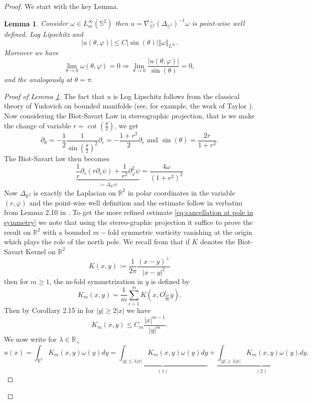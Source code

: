 \documentclass[10pt]{article}
\numberwithin{equation}{section}
\theoremstyle{plain}
\newtheorem{lemma}{Lemma}[section]
\theoremstyle{definition}
\newcommand{\prt}[1]{\left( #1 \right)}
\newcommand{\norm}[1]{\left\Vert #1 \right\Vert}
\newcommand{\abs}[1]{\left| #1 \right|}
\numberwithin{equation}{section}
\begin{document}
\begin{proof}
We start with the key Lemma. 
\begin{lemma}\label{lem:boundness of BS}
Consider $\omega\in L^\infty_m(\mathbb{S}^2)$ then $u=\nabla^\perp_{\mathbb{S}^2}\prt{\Delta_{\mathbb{S}^2}}^{-1}\omega$ is point-wise well defined, Log Lipschitz and 
\[
\abs{u(\theta,\varphi)}\leq C \abs{\sin(\theta)} \norm{\omega}_{L^\infty}.
\]
Moreover we have 
\begin{equation}\label{eq:cancellation at pole in symmetry}
\lim_{\theta\rightarrow 0}\omega(\theta,\varphi)=0\Longrightarrow \lim_{\theta\rightarrow 0} \frac{\abs{u(\theta,\varphi)}}{\sin(\theta)}=0,
\end{equation}
and the analogously at $\theta=\pi$.
\end{lemma}
\begin{proof}[Proof of Lemma \ref{lem:boundness of BS}]
The fact that $u$ is Log Lipschitz follows from the classical theory of Yudovich on bounded manifolds (see, for example, the work of Taylor \cite{Taylor}). Now considering the Biot-Savart Law in stereographic projection, that is we make the change of variable $r=\cot\prt{\frac{\theta}{2}}$, we get 
\[
\partial_\theta =-\frac{1}{2}\frac{1}{\sin\prt{\frac{\theta}{2}}^2}\partial_r=-\frac{1+r^2}{2}\partial_r \text{ and } \sin(\theta)=\frac{2r}{1+r^2}.
\]
The Biot-Savart law then becomes 
\[\underbrace{\frac{1}{r}\partial_r\prt{r\partial_r \psi}+\frac{1}{r^2}\partial_\varphi^2 \psi}_{:=\Delta_{\mathbb{R}^2}\psi}=\frac{4\omega}{(1+r^2)^2}\]
Now $\Delta_{\mathbb{R}^2}$ is exactly the Laplacian on $\mathbb{R}^2$ in polar coordinates in the variable $(r,\varphi)$ and the point-wise well definition and the estimate follow in verbatim from Lemma 2.10 in \cite{EJ-symmetries}. To get the more refined estimate \eqref{eq:cancellation at pole in symmetry} we note that using the stereo-graphic projection it suffice to prove the result on $\mathbb{R}^2$ with a bounded $m-$fold symmetric vorticity vanishing at the origin which plays the role of the north pole.  We recall from \cite{EJ-symmetries} that if $K$ denotes the Biot-Savart Kernel on $\mathbb{R}^2$
\[
K(x,y):=\frac{1}{2\pi}\frac{(x-y)^\perp}{\abs{x-y}^2}
\]
then for $m\geq 1$, the m-fold symmetrization in $y$ is defined by
\[
K_m(x,y)=\frac{1}{m}\sum^m_{i=1}K(x,O^i_{\frac{2\pi}{m}}y).
\]
Then by Corollary 2.15 in \cite{EJ-symmetries} for $\abs{y}\geq 2\abs{x}$ we have 
\[
K_m(x,y)\leq C_m \frac{\abs{x}^{m-1}}{\abs{y}^m}.
\]
We now write for $\lambda \in \mathbb{R}_+$
\[
u(x)=\int_{\mathbb{R}^2}K_m(x,y)\omega(y)dy=\underbrace{\int_{\abs{y}\leq \lambda \abs{x}}K_m(x,y)\omega(y)dy}_{(1)}+\underbrace{\int_{\abs{y}\geq \lambda \abs{x}}K_m(x,y)\omega(y)dy}_{(2)}.
\]
\end{proof}
\end{proof}
\end{document}
